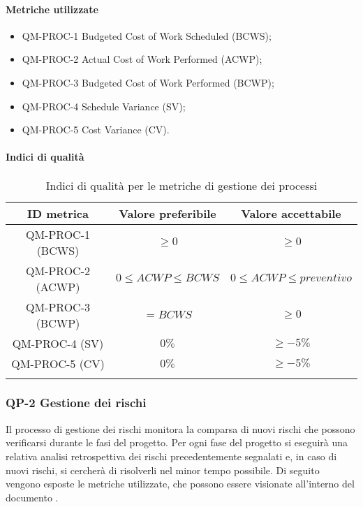 		\paragraph{Metriche utilizzate}

			\begin{itemize}
				\item QM-PROC-1 Budgeted Cost of Work Scheduled (BCWS);
				\item QM-PROC-2 Actual Cost of Work Performed (ACWP);
				\item QM-PROC-3 Budgeted Cost of Work Performed (BCWP);
				\item QM-PROC-4 Schedule Variance (SV);
				\item QM-PROC-5 Cost Variance (CV).
			\end{itemize}
		\pagebreak
		\paragraph{Indici di qualità}

			\begin{center}
				\begin{longtable}{|c|c|c|}
				\hline
				\rowcolor{lighter-grayer}
				\textbf{ID metrica} & \textbf{Valore preferibile} & \textbf{Valore accettabile}\\
				\hline
				\endfirsthead
				\hline
				QM-PROC-1 (BCWS) & \(\ge 0\) & \(\ge 0\) \\
				\hline
				QM-PROC-2 (ACWP) & \(0 \le ACWP \le BCWS\) & \(0 \le ACWP \le preventivo\) \\
				\hline
				QM-PROC-3 (BCWP) & \(= BCWS\) & \(\ge 0\) \\
				\hline
				QM-PROC-4 (SV) & \(0\%\) & \(\ge -5\%\) \\
				\hline
				QM-PROC-5 (CV) & \(0\%\) & \(\ge -5\%\) \\
				\hline
				\caption{Indici di qualità per le metriche di gestione dei processi}
				\end{longtable}
			\end{center}

	\subsubsection{QP-2 Gestione dei rischi}

		Il processo di gestione dei rischi monitora la comparsa di nuovi rischi che possono verificarsi durante le fasi del progetto.
		\newline
		Per ogni fase del progetto si eseguirà una relativa analisi retrospettiva dei rischi precedentemente segnalati e, in caso di nuovi rischi, si cercherà di risolverli nel minor tempo possibile.
		\newline
		Di seguito vengono esposte le metriche utilizzate, che possono essere visionate all'interno del documento .

